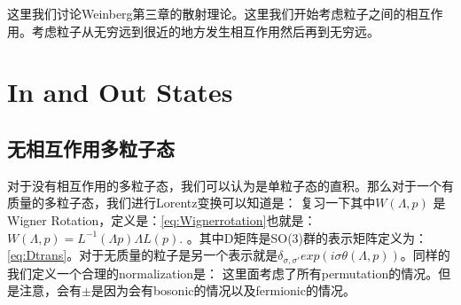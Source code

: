 这里我们讨论Weinberg第三章的散射理论。这里我们开始考虑粒子之间的相互作用。考虑粒子从无穷远到很近的地方发生相互作用然后再到无穷远。

\section{In and Out States}

\subsection{无相互作用多粒子态}
对于没有相互作用的多粒子态，我们可以认为是单粒子态的直积。那么对于一个有质量的多粒子态，我们进行Lorentz变换可以知道是：
复习一下其中$ W(\Lambda,p) $ 是Wigner Rotation，定义是：\cref{eq:Wignerrotation}也就是：$ W(\Lambda,p)=L^{-1}(\Lambda p)\Lambda L(p). $ 。其中D矩阵是SO(3)群的表示矩阵定义为：\cref{eq:Dtrans}。对于无质量的粒子是另一个表示就是$ \delta_{\sigma,\sigma'} exp(i \sigma \theta(\Lambda,p))$。同样的我们定义一个合理的normalization是：
这里面考虑了所有permutation的情况。但是注意，会有$ \pm $是因为会有bosonic的情况以及fermionic的情况。
